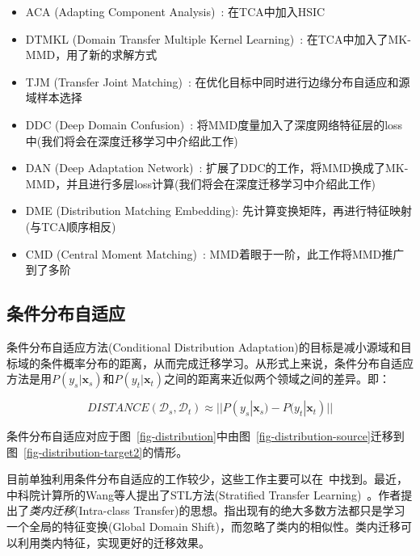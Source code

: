 \begin{itemize}
	\item ACA (Adapting Component Analysis)~\cite{dorri2012adapting}: 在TCA中加入HSIC
	\item DTMKL (Domain Transfer Multiple Kernel Learning)~\cite{duan2012domain}: 在TCA中加入了MK-MMD，用了新的求解方式
	\item TJM (Transfer Joint Matching)~\cite{long2014transfer}: 在优化目标中同时进行边缘分布自适应和源域样本选择
	\item DDC (Deep Domain Confusion)~\cite{tzeng2014deep}: 将MMD度量加入了深度网络特征层的loss中(我们将会在深度迁移学习中介绍此工作)
	\item DAN (Deep Adaptation Network)~\cite{long2015learning}: 扩展了DDC的工作，将MMD换成了MK-MMD，并且进行多层loss计算(我们将会在深度迁移学习中介绍此工作)
	\item DME (Distribution Matching Embedding): 先计算变换矩阵，再进行特征映射(与TCA顺序相反)
	\item CMD (Central Moment Matching)~\cite{zellinger2017central}: MMD着眼于一阶，此工作将MMD推广到了多阶
\end{itemize}

\subsection{条件分布自适应}

条件分布自适应方法(Conditional Distribution Adaptation)的目标是减小源域和目标域的条件概率分布的距离，从而完成迁移学习。从形式上来说，条件分布自适应方法是用$P(y_s|\mathbf{x}_s)$和$P(y_t|\mathbf{x}_t)$之间的距离来近似两个领域之间的差异。即：

\begin{equation}
\label{eq-conditional-general}
DISTANCE(\mathcal{D}_s,\mathcal{D}_t) \approx ||P(y_s|\mathbf{x}_s) - P(y_t|\mathbf{x}_t)||
\end{equation}

条件分布自适应对应于图~\ref{fig-distribution}中由图~\ref{fig-distribution-source}迁移到图~\ref{fig-distribution-target2}的情形。

目前单独利用条件分布自适应的工作较少，这些工作主要可以在~\cite{saito2017asymmetric}中找到。最近，中科院计算所的Wang等人提出了STL方法(Stratified Transfer Learning)~\cite{wang2018stratified}。作者提出了\textit{类内迁移}(Intra-class Transfer)的思想。指出现有的绝大多数方法都只是学习一个全局的特征变换(Global Domain Shift)，而忽略了类内的相似性。类内迁移可以利用类内特征，实现更好的迁移效果。

